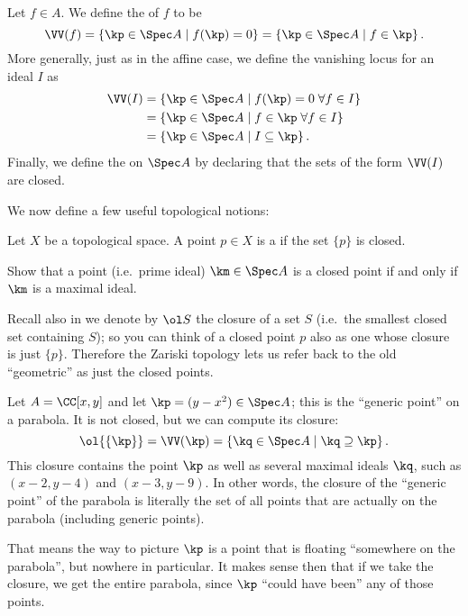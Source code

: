 \begin{definition}
	Let $f \in A$. We define the  of $f$ to be
	\[ \VV(f) = \left\{ \kp \in \Spec A \mid f(\kp) = 0 \right\}
		= \left\{ \kp \in \Spec A \mid f \in \kp \right\}. \]
	More generally, just as in the affine case,
	we define the vanishing locus for an ideal $I$ as
	\begin{align*}
		\VV(I) &= \left\{ \kp \in \Spec A \mid f(\kp)=0 \; \forall f \in I \right\} \\
		&= \left\{ \kp \in \Spec A \mid f \in \kp \; \forall f \in I \right\} \\
		&= \left\{ \kp \in \Spec A \mid I \subseteq \kp \right\}.
	\end{align*}
	Finally, we define the  on $\Spec A$
	by declaring that the sets of the form $\VV(I)$ are closed.
\end{definition}

We now define a few useful topological notions:
\begin{definition}
	Let $X$ be a topological space.
	A point $p \in X$ is a 
	if the set $\{p\}$ is closed.
\end{definition}
\begin{ques}
	[Mandatory]
	Show that a point (i.e.\ prime ideal)
	$\km \in \Spec A$ is a closed point
	if and only if $\km$ is a maximal ideal.
\end{ques}
Recall also in  we denote by $\ol S$
the closure of a set $S$ (i.e.\ the smallest closed set containing $S$);
so you can think of a closed point $p$ also
as one whose closure is just $\{p\}$.
Therefore the Zariski topology lets us refer back to the old ``geometric''
as just the closed points.

\begin{example}
	Let $A = \CC[x,y]$ and let $\kp = (y-x^2) \in \Spec A$;
	this is the ``generic point'' on a parabola.
	It is not closed, but we can compute its closure:
	\[
		\ol{\{\kp\}}
		= \VV(\kp) = \left\{ \kq \in \Spec A \mid \kq \supseteq \kp \right\}.
	\]
	This closure contains the point $\kp$ as well
	as several maximal ideals $\kq$, such as $(x-2,y-4)$ and $(x-3,y-9)$.
	In other words, the closure of the ``generic point'' of the parabola
	is literally the set of all points that are actually on the parabola
	(including generic points).

	That means the way to picture $\kp$ is a point that
	is floating ``somewhere on the parabola'', but nowhere in particular.
	It makes sense then that if we take the closure,
	we get the entire parabola,
	since $\kp$ ``could have been'' any of those points.
\end{example}

